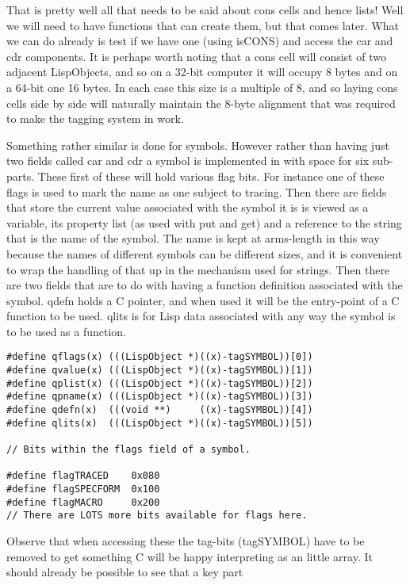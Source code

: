 That is pretty well all that needs to be said about {\tx cons} cells and
hence lists! Well we will need to have functions that can create them, but
that comes later. What we can do already is test if we have one (using
{\tx isCONS}) and access the {\tx car} and {\tx cdr} components. It is
perhaps worth noting that a {\tx cons} cell will consist of two
adjacent {\tx LispObject}s, and so on a 32-bit computer it will
occupy 8 bytes and on a 64-bit one 16 bytes. In each case this size
is a multiple of 8, and so laying {\tx cons} cells side by side will
naturally maintain the 8-byte alignment that was required to make the
tagging system in \vsl{} work.

Something rather similar is done for symbols. However rather than having
just two fields called {\tx car} and {\tx cdr} a symbol is implemented
in \vsl{} with space for six sub-parts. These first of these will
hold various flag bits. For instance one of these flags is used to mark
the name as one subject to tracing. Then there are fields that store the
current value associated with the symbol it is is viewed as a variable,
its property list (as used with {\tx put} and {\tx get}) and a reference
to the string that is the name of the symbol. The name is kept at arms-length
in this way because the names of different symbols can be different sizes, and
it is convenient to wrap the handling of that up in the mechanism used for
strings. Then there are two fields that are to do with having a function
definition associated with the symbol. {\tx qdefn} holds a C pointer, and
when used it will be the entry-point of a C function to be used. {\tx qlits}
is for Lisp data associated with any way the symbol is to be used as a
function.
{\small\begin{verbatim}
#define qflags(x) (((LispObject *)((x)-tagSYMBOL))[0])
#define qvalue(x) (((LispObject *)((x)-tagSYMBOL))[1])
#define qplist(x) (((LispObject *)((x)-tagSYMBOL))[2])
#define qpname(x) (((LispObject *)((x)-tagSYMBOL))[3])
#define qdefn(x)  (((void **)     ((x)-tagSYMBOL))[4])
#define qlits(x)  (((LispObject *)((x)-tagSYMBOL))[5])

// Bits within the flags field of a symbol.

#define flagTRACED    0x080
#define flagSPECFORM  0x100
#define flagMACRO     0x200
// There are LOTS more bits available for flags here.
\end{verbatim}}
Observe that when accessing these the tag-bits ({\tx tagSYMBOL}) have to
be removed to get something C will be happy interpreting as an
little array. It should already be possible to see that a key part

